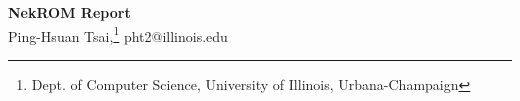 \documentclass[11pt]{article}
\begin{document}
\setlength{\parindent}{0.25in}

\medskip                        %

\thispagestyle{plain}
\begin{center}                  %
   \textbf{\Large NekROM Report}
   \\[2ex]
Ping-Hsuan Tsai,\footnote{Dept. of Computer Science, University of Illinois, Urbana-Champaign}
pht2@illinois.edu \\
\end{center}



\nocite{*}


\end{document}
